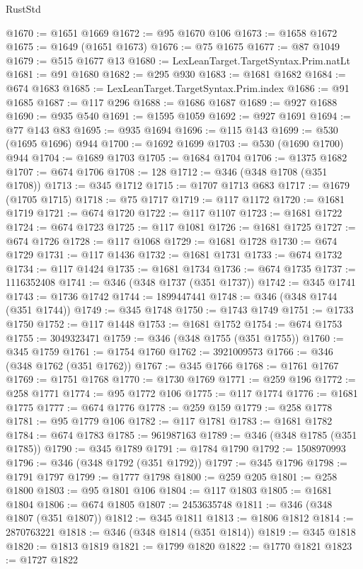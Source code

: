 \begin{lexlean}{RustStd}
\begin{coremodule}
{\begin{coremodule}
{{{{{{{{{{{{{{{{{{{{{{{{{{{{{{{{{{{{{{{@1670 := @1651 @1669
@1672 := @95 @1670 @106
@1673 := @1658 @1672
@1675 := @1649 (@1651 @1673)
@1676 := @75 @1675
@1677 := @87 @1049
@1679 := @515 @1677 @13
@1680 := LexLeanTarget.TargetSyntax.Prim.natLt
@1681 := @91 @1680
@1682 := @295 @930
@1683 := @1681 @1682
@1684 := @674 @1683
@1685 := LexLeanTarget.TargetSyntax.Prim.index
@1686 := @91 @1685
@1687 := @117 @296
@1688 := @1686 @1687
@1689 := @927 @1688
@1690 := @935 @540
@1691 := @1595 @1059
@1692 := @927 @1691
@1694 := @77 @143 @83
@1695 := @935 @1694
@1696 := @115 @143
@1699 := @530 (@1695 @1696) @944
@1700 := @1692 @1699
@1703 := @530 (@1690 @1700) @944
@1704 := @1689 @1703
@1705 := @1684 @1704
@1706 := @1375 @1682
@1707 := @674 @1706
@1708 := 128
@1712 := @346 (@348 @1708 (@351 @1708))
@1713 := @345 @1712
@1715 := @1707 @1713 @683
@1717 := @1679 (@1705 @1715)
@1718 := @75 @1717
@1719 := @117 @1172
@1720 := @1681 @1719
@1721 := @674 @1720
@1722 := @117 @1107
@1723 := @1681 @1722
@1724 := @674 @1723
@1725 := @117 @1081
@1726 := @1681 @1725
@1727 := @674 @1726
@1728 := @117 @1068
@1729 := @1681 @1728
@1730 := @674 @1729
@1731 := @117 @1436
@1732 := @1681 @1731
@1733 := @674 @1732
@1734 := @117 @1424
@1735 := @1681 @1734
@1736 := @674 @1735
@1737 := 1116352408
@1741 := @346 (@348 @1737 (@351 @1737))
@1742 := @345 @1741
@1743 := @1736 @1742
@1744 := 1899447441
@1748 := @346 (@348 @1744 (@351 @1744))
@1749 := @345 @1748
@1750 := @1743 @1749
@1751 := @1733 @1750
@1752 := @117 @1448
@1753 := @1681 @1752
@1754 := @674 @1753
@1755 := 3049323471
@1759 := @346 (@348 @1755 (@351 @1755))
@1760 := @345 @1759
@1761 := @1754 @1760
@1762 := 3921009573
@1766 := @346 (@348 @1762 (@351 @1762))
@1767 := @345 @1766
@1768 := @1761 @1767
@1769 := @1751 @1768
@1770 := @1730 @1769
@1771 := @259 @196
@1772 := @258 @1771
@1774 := @95 @1772 @106
@1775 := @117 @1774
@1776 := @1681 @1775
@1777 := @674 @1776
@1778 := @259 @159
@1779 := @258 @1778
@1781 := @95 @1779 @106
@1782 := @117 @1781
@1783 := @1681 @1782
@1784 := @674 @1783
@1785 := 961987163
@1789 := @346 (@348 @1785 (@351 @1785))
@1790 := @345 @1789
@1791 := @1784 @1790
@1792 := 1508970993
@1796 := @346 (@348 @1792 (@351 @1792))
@1797 := @345 @1796
@1798 := @1791 @1797
@1799 := @1777 @1798
@1800 := @259 @205
@1801 := @258 @1800
@1803 := @95 @1801 @106
@1804 := @117 @1803
@1805 := @1681 @1804
@1806 := @674 @1805
@1807 := 2453635748
@1811 := @346 (@348 @1807 (@351 @1807))
@1812 := @345 @1811
@1813 := @1806 @1812
@1814 := 2870763221
@1818 := @346 (@348 @1814 (@351 @1814))
@1819 := @345 @1818
@1820 := @1813 @1819
@1821 := @1799 @1820
@1822 := @1770 @1821
@1823 := @1727 @1822
}}}}}}}}}}}}}}}}}}}}}}}}}}}}}}}}}}}}}}}
\end{coremodule}}
\end{coremodule}
\end{lexlean}
